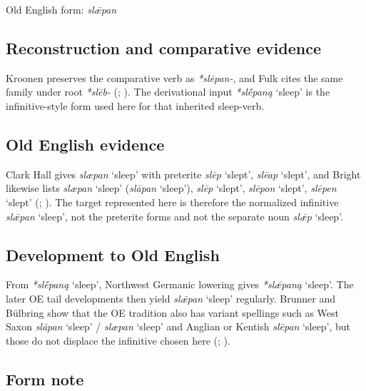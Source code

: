 \documentclass[
  british,
  a4paper,
  openany]{book}
\providecommand{\Recon}[1]{\emph{*#1}}
{\catcode`→=\active \global\def→{\ensuremath{\rightarrow}}}
\providecommand{\Recon}[1]{\emph{*#1}}
{\catcode`→=\active \global\def→{\ensuremath{\rightarrow}}}
\begin{document}
Old English form: \emph{slǣpan}

\subsection{Reconstruction and comparative
evidence}\label{reconstruction-and-comparative-evidence-46}

Kroonen preserves the comparative verb as \emph{*slēpan-}, and Fulk
cites the same family under root \emph{*slēb-}
(; ). The derivational input \Recon{slḗpaną} `sleep' is the
infinitive-style form used here for that inherited sleep-verb.

\subsection{Old English evidence}\label{old-english-evidence-46}

Clark Hall gives {\emph{slæpan}} `sleep' with preterite \emph{slēp}
`slept', \emph{slēap} `slept', and Bright likewise lists {\emph{slæpan}}
`sleep' ({\emph{slāpan}} `sleep'), \emph{slēp} `slept', \emph{slēpon}
`slept', \emph{slēpen} `slept' (; ). The
target represented here is therefore the normalized infinitive
\emph{slǣpan} `sleep', not the preterite forms and not the separate noun
\emph{slǣp} `sleep'.

\subsection{Development to Old
English}\label{development-to-old-english-46}

From \Recon{slḗpaną} `sleep', Northwest Germanic lowering gives
\Recon{slǣpaną} `sleep'. The later OE tail developments then yield
{\emph{slǣpan}} `sleep' regularly. Brunner and Bülbring show that the OE
tradition also has variant spellings such as West Saxon {\emph{slāpan}}
`sleep' / {\emph{slæpan}} `sleep' and Anglian or Kentish {\emph{slēpan}}
`sleep', but those do not displace the infinitive chosen here
(;
).

\subsection{Form note}\label{form-note-17}
\end{document}
